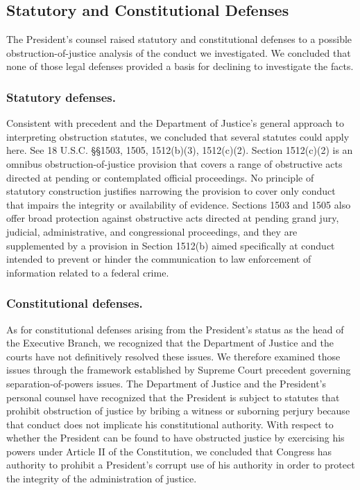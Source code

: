 \subsection{Statutory and Constitutional Defenses}

The President’s counsel raised statutory and constitutional defenses to a possible obstruction-of-justice analysis of the conduct we investigated.
We concluded that none of those legal defenses provided a basis for declining to investigate the facts.

\subsubsection*{Statutory defenses.}

Consistent with precedent and the Department of Justice’s general approach to interpreting obstruction statutes, we concluded that several statutes could apply here.
See 18 U.S.C. \S\S 1503, 1505, 1512(b)(3), 1512(c)(2).
Section 1512(c)(2) is an omnibus obstruction-of-justice provision that covers a range of obstructive acts directed at pending or contemplated official proceedings.
No principle of statutory construction justifies narrowing the provision to cover only conduct that impairs the integrity or availability of evidence.
Sections 1503 and 1505 also offer broad protection against obstructive acts directed at pending grand jury, judicial, administrative, and congressional proceedings, and they are supplemented by a provision in Section 1512(b) aimed specifically at conduct intended to prevent or hinder the communication to law enforcement of information related to a federal crime.

\subsubsection*{Constitutional defenses.}

As for constitutional defenses arising from the President’s status as the head of the Executive Branch, we recognized that the Department of Justice and the courts have not definitively resolved these issues.
We therefore examined those issues through the framework established by Supreme Court precedent governing separation-of-powers issues.
The Department of Justice and the President’s personal counsel have recognized that the President is subject to statutes that prohibit obstruction of justice by bribing a witness or suborning perjury because that conduct does not implicate his constitutional authority.
With respect to whether the President can be found to have obstructed justice by exercising his powers under Article II of the Constitution, we concluded that Congress has authority to prohibit a President’s corrupt use of his authority in order to protect the integrity of the administration of justice.

